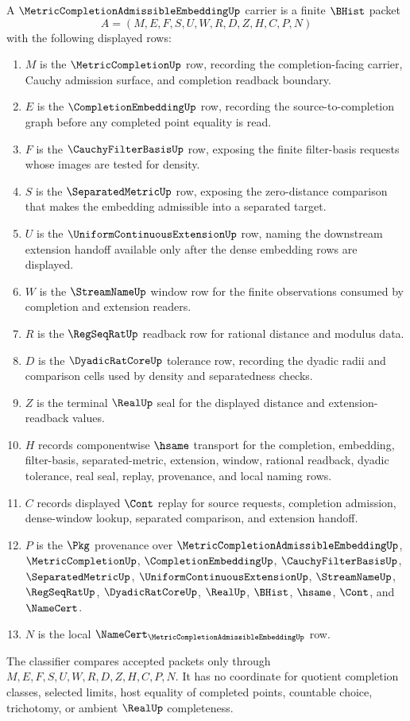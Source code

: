 \begin{definition}
\label{def:metric-completion-admissible-embedding-carrier}
A $\MetricCompletionAdmissibleEmbeddingUp$ carrier is a finite $\BHist$ packet
$$
A=(M,E,F,S,U,W,R,D,Z,H,C,P,N)
$$
with the following displayed rows:
\begin{enumerate}
\item $M$ is the $\MetricCompletionUp$ row, recording the completion-facing carrier, Cauchy admission surface, and completion readback boundary.
\item $E$ is the $\CompletionEmbeddingUp$ row, recording the source-to-completion graph before any completed point equality is read.
\item $F$ is the $\CauchyFilterBasisUp$ row, exposing the finite filter-basis requests whose images are tested for density.
\item $S$ is the $\SeparatedMetricUp$ row, exposing the zero-distance comparison that makes the embedding admissible into a separated target.
\item $U$ is the $\UniformContinuousExtensionUp$ row, naming the downstream extension handoff available only after the dense embedding rows are displayed.
\item $W$ is the $\StreamNameUp$ window row for the finite observations consumed by completion and extension readers.
\item $R$ is the $\RegSeqRatUp$ readback row for rational distance and modulus data.
\item $D$ is the $\DyadicRatCoreUp$ tolerance row, recording the dyadic radii and comparison cells used by density and separatedness checks.
\item $Z$ is the terminal $\RealUp$ seal for the displayed distance and extension-readback values.
\item $H$ records componentwise $\hsame$ transport for the completion, embedding, filter-basis, separated-metric, extension, window, rational readback, dyadic tolerance, real seal, replay, provenance, and local naming rows.
\item $C$ records displayed $\Cont$ replay for source requests, completion admission, dense-window lookup, separated comparison, and extension handoff.
\item $P$ is the $\Pkg$ provenance over $\MetricCompletionAdmissibleEmbeddingUp$, $\MetricCompletionUp$, $\CompletionEmbeddingUp$, $\CauchyFilterBasisUp$, $\SeparatedMetricUp$, $\UniformContinuousExtensionUp$, $\StreamNameUp$, $\RegSeqRatUp$, $\DyadicRatCoreUp$, $\RealUp$, $\BHist$, $\hsame$, $\Cont$, and $\NameCert$.
\item $N$ is the local $\NameCert_{\MetricCompletionAdmissibleEmbeddingUp}$ row.
\end{enumerate}
The classifier compares accepted packets only through $M,E,F,S,U,W,R,D,Z,H,C,P,N$. It has no coordinate for quotient completion classes, selected limits, host equality of completed points, countable choice, trichotomy, or ambient $\RealUp$ completeness.
\end{definition}

